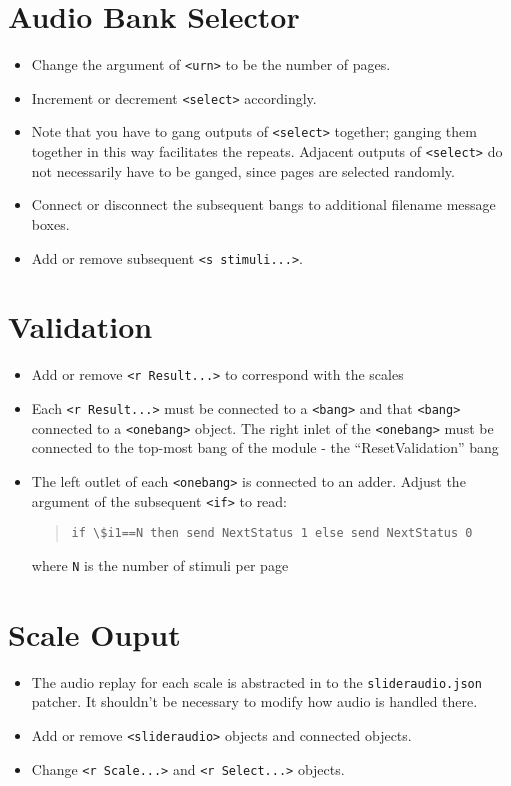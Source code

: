 \documentclass[10pt]{article}
\begin{document}
\section{Audio Bank Selector}
\begin{itemize}
\item Change the argument of \verb|<urn>| to be the number of pages.
\item Increment or decrement \verb|<select>| accordingly.
\item Note that you have to gang outputs of \verb|<select>| together; ganging them together in this way facilitates the repeats. Adjacent outputs of \verb|<select>| do not necessarily have to be ganged, since pages are selected randomly.
\item Connect or disconnect the subsequent bangs to additional filename message boxes.
\item Add or remove subsequent \verb|<s stimuli...>|.
\end{itemize}

\section{Validation}
\begin{itemize}
\item Add or remove \verb|<r Result...>| to correspond with the scales
\item Each \verb|<r Result...>| must be connected to a \verb|<bang>| and that \verb|<bang>| connected to a \verb|<onebang>| object. The right inlet of the \verb|<onebang>| must be connected to the top-most bang of the module - the ``ResetValidation'' bang
\item The left outlet of each \verb|<onebang>| is connected to an adder. Adjust the argument of the subsequent \verb|<if>| to read:\begin{quote}\verb|if \$i1==N then send NextStatus 1 else send NextStatus 0|\end{quote}where \verb|N| is the number of stimuli per page
\end{itemize}

\section{Scale Ouput}
\begin{itemize}
\item The audio replay for each scale is abstracted in to the \verb|slideraudio.json| patcher. It shouldn't be necessary to modify how audio is handled there.
\item Add or remove \verb|<slideraudio>| objects and connected objects.
\item Change \verb|<r Scale...>| and \verb|<r Select...>| objects.
\end{itemize}
\end{document}
